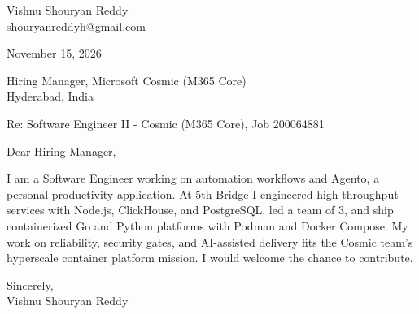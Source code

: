 \documentclass[a4paper,11pt]{article}
\begin{document}
\pagestyle{empty}
Vishnu Shouryan Reddy \\
shouryanreddyh@gmail.com

\vspace{1em}
November 15, 2026

\vspace{1em}
Hiring Manager, Microsoft Cosmic (M365 Core) \\
Hyderabad, India

\vspace{1em}
Re: Software Engineer II - Cosmic (M365 Core), Job 200064881

\vspace{1em}
Dear Hiring Manager,

\vspace{0.5em}
I am a Software Engineer working on automation workflows and Agento, a personal productivity application. At 5th Bridge I engineered high-throughput services with Node.js, ClickHouse, and PostgreSQL, led a team of 3, and ship containerized Go and Python platforms with Podman and Docker Compose. My work on reliability, security gates, and AI-assisted delivery fits the Cosmic team's hyperscale container platform mission. I would welcome the chance to contribute.

\vspace{1em}
Sincerely, \\
Vishnu Shouryan Reddy
\end{document}
